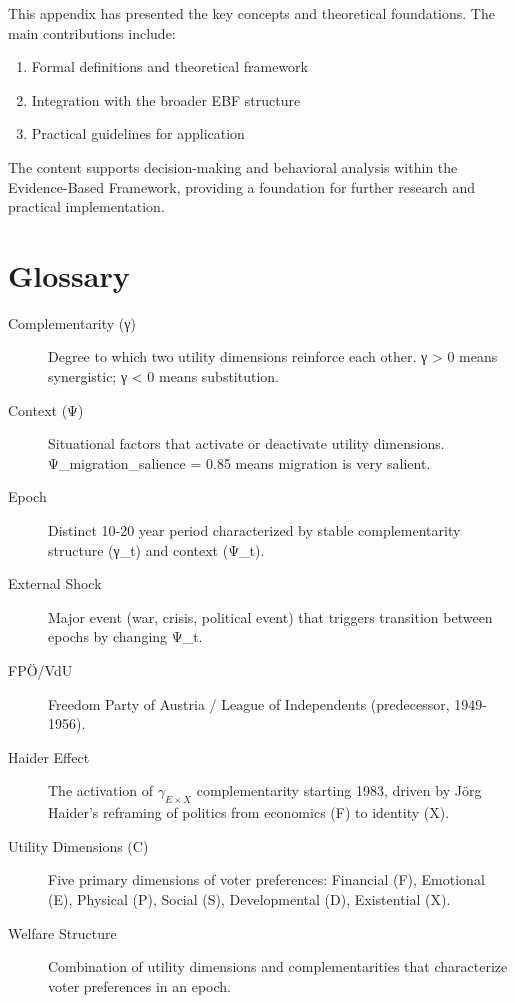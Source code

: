 This appendix has presented the key concepts and theoretical foundations.
The main contributions include:

\begin{enumerate}
    \item Formal definitions and theoretical framework
    \item Integration with the broader EBF structure
    \item Practical guidelines for application
\end{enumerate}

The content supports decision-making and behavioral analysis within the
Evidence-Based Framework, providing a foundation for further research
and practical implementation.


\section{Glossary}
\label{sec:glossary}

\begin{description}

\item[Complementarity (γ)] Degree to which two utility dimensions reinforce each other. γ > 0 means synergistic; γ < 0 means substitution.

\item[Context (Ψ)] Situational factors that activate or deactivate utility dimensions. Ψ_migration_salience = 0.85 means migration is very salient.

\item[Epoch] Distinct 10-20 year period characterized by stable complementarity structure (γ_t) and context (Ψ_t).

\item[External Shock] Major event (war, crisis, political event) that triggers transition between epochs by changing Ψ_t.

\item[FPÖ/VdU] Freedom Party of Austria / League of Independents (predecessor, 1949-1956).

\item[Haider Effect] The activation of $\gamma_{E \times X}$ complementarity starting 1983, driven by Jörg Haider's reframing of politics from economics (F) to identity (X).

\item[Utility Dimensions (C)] Five primary dimensions of voter preferences: Financial (F), Emotional (E), Physical (P), Social (S), Developmental (D), Existential (X).

\item[Welfare Structure] Combination of utility dimensions and complementarities that characterize voter preferences in an epoch.

\end{description}

